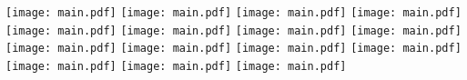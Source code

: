 \documentclass{article}
\begin{document}
\centering
\texttt{[image: main.pdf]}
\texttt{[image: main.pdf]}
\texttt{[image: main.pdf]}
\texttt{[image: main.pdf]}
\texttt{[image: main.pdf]}
\texttt{[image: main.pdf]}
\texttt{[image: main.pdf]}
\texttt{[image: main.pdf]}
\texttt{[image: main.pdf]}
\texttt{[image: main.pdf]}
\texttt{[image: main.pdf]}
\texttt{[image: main.pdf]}
\texttt{[image: main.pdf]}
\texttt{[image: main.pdf]}
\texttt{[image: main.pdf]}
\end{document}
